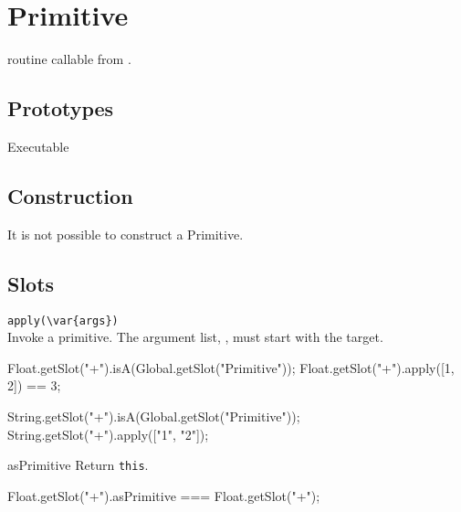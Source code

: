 
\section{Primitive}
\Cxx routine callable from \us.

\subsection{Prototypes}
\begin{refObjects}
\item[Executable]
\end{refObjects}

\subsection{Construction}

It is not possible to construct a Primitive.

\subsection{Slots}

\begin{urbiscriptapi}
\item \lstinline|apply(\var{args})|\\
  Invoke a primitive.  The argument list, , must start with
  the target.
\begin{urbiassert}
Float.getSlot("+").isA(Global.getSlot("Primitive"));
Float.getSlot("+").apply([1, 2]) == 3;

String.getSlot("+").isA(Global.getSlot("Primitive"));
String.getSlot("+").apply(["1", "2"]);
\end{urbiassert}

\item[asPrimitive] Return \lstinline|this|.
\begin{urbiassert}
Float.getSlot("+").asPrimitive === Float.getSlot("+");
\end{urbiassert}
\end{urbiscriptapi}


